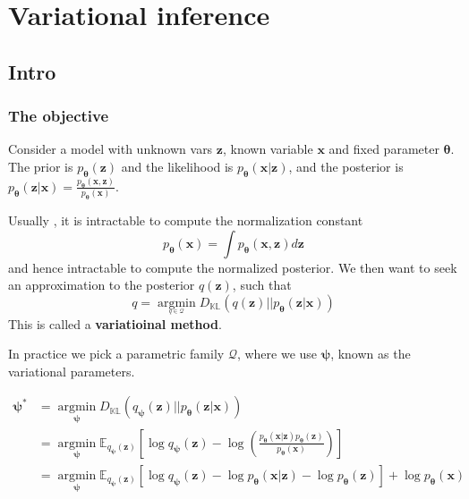 \documentclass[../main.tex]{subfiles}
\begin{document}
\chapter{Variational inference}

\section{Intro}

\subsection{The objective}

Consider a model with unknown vars $\boldsymbol{z}$, known variable $\boldsymbol{x}$ and fixed parameter $\boldsymbol{\theta}$.
The prior is $p_{\boldsymbol{\theta}}(\boldsymbol{z})$ and the likelihood is $p_{\boldsymbol{\theta}}(\boldsymbol{x} | \boldsymbol{z})$, and the posterior is 
$p_{\boldsymbol{\theta}}(\boldsymbol{z} | \boldsymbol{x}) = \frac{p_{\boldsymbol{\theta}}(\boldsymbol{x}, \boldsymbol{z})}{p_{\boldsymbol{\theta}}(\boldsymbol{x})}$.


Usually , it is intractable to compute the normalization constant
\[
p_{\boldsymbol{\theta}}(\boldsymbol{x}) = \int p_{\boldsymbol{\theta}} (\boldsymbol{x}, \boldsymbol{z}) d \boldsymbol{z}
\]
and hence intractable to compute the normalized posterior. We then want to seek an approximation to the posterior $q(\boldsymbol{z})$, such that
\[
q = \mathop{\arg\min}\limits_{_{q \in  \mathcal{Q}}} D_{\mathbb{KL}} \left( q(\boldsymbol{z}) || p_{\boldsymbol{\theta}}(\boldsymbol{z} | \boldsymbol{x}) \right) 
\]
This is called a \textbf{variatioinal method}.

In practice we pick a parametric family $\mathcal{Q}$, where we use $\boldsymbol{\psi}$, known as the variational parameters.

\[
\begin{aligned}
\boldsymbol{\psi}^{*} &= \mathop{\arg\min}\limits_{\boldsymbol{\psi}}  D_{\mathbb{KL}}(q_{\boldsymbol{\psi}}(\boldsymbol{z}) || p_{\boldsymbol{\theta}}(\boldsymbol{z} | \boldsymbol{x}))\\
&=  \mathop{\arg\min}\limits_{\boldsymbol{\psi}}  \mathbb{E}_{q_{\boldsymbol{\psi}}(\boldsymbol{z})} \left[ \log q_{\boldsymbol{\psi}}(\boldsymbol{z}) - \log  \left(  \frac{p_{\boldsymbol{\theta}}(\boldsymbol{x} | \boldsymbol{z}) p_{\boldsymbol{\theta}}(\boldsymbol{z})}{p_{\boldsymbol{\theta}}(\boldsymbol{x})} \right)  \right] \\ 
&= \mathop{\arg\min}\limits_{\boldsymbol{\psi}} \mathbb{E}_{q_{\boldsymbol{\psi}}(\boldsymbol{z})} \left[ \log q_{\boldsymbol{\psi}}(\boldsymbol{z}) - \log p_{\boldsymbol{\theta}}(\boldsymbol{x} | \boldsymbol{z}) - \log p_{\boldsymbol{\theta}}(\boldsymbol{z})\right]  + \log p_{\boldsymbol{\theta}}(\boldsymbol{x})
\end{aligned}
\]
\end{document}
